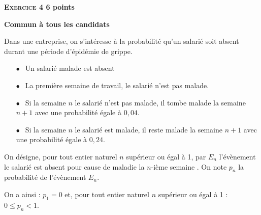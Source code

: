 \documentclass[10pt]{article}
\begin{document}
\vspace{0,5cm}
 
\textbf{\textsc{Exercice 4} \hfill 6 points}
 
\textbf{Commun  à tous les candidats}

\medskip

Dans une entreprise, on s'intéresse à la probabilité qu'un salarié soit absent durant une période d'épidémie de grippe.

\medskip
\setlength\parindent{8mm}
\begin{itemize}
\item[$\bullet~~$] Un salarié malade est absent 
\item[$\bullet~~$] La première semaine de travail, le salarié n'est pas malade. 
\item[$\bullet~~$] Si la semaine $n$ le salarié n'est pas malade, il tombe malade la semaine $n + 1$ avec une probabilité égale à $0,04$. 
\item[$\bullet~~$] Si la semaine $n$ le salarié est malade, il reste malade la semaine $n + 1$ avec une probabilité égale à $0,24$.
\end{itemize}
\setlength\parindent{0mm}
 
On désigne, pour tout entier naturel $n$ supérieur ou égal à 1, par $E_{n}$ l'évènement \og le salarié est absent pour cause de maladie la $n$-ième semaine \fg. On note $p_{n}$ la probabilité de l'évènement $E_{n}$.
 
On a ainsi : $p_{1} = 0$ et, pour tout entier naturel $n$ supérieur ou égal à 1 : $0 \leqslant  p_{n} < 1$.

\medskip
 
\end{document}
